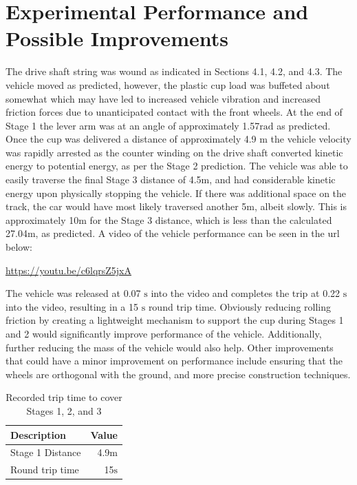 \documentclass[a4paper]{article}
\begin{document}
\section{Experimental Performance and Possible Improvements}
The drive shaft string was wound as indicated in Sections 4.1, 4.2, and 4.3. The vehicle moved as predicted, however, the plastic cup load was buffeted about somewhat which may have led to increased vehicle vibration and increased friction forces due to unanticipated contact with the front wheels. At the end of Stage 1 the lever arm was at an angle of approximately 1.57$\si{\radian}$ as predicted. Once the cup was delivered a distance of approximately 4.9 $\si{\meter}$ the vehicle velocity was rapidly arrested as the counter winding on the drive shaft converted kinetic energy to potential energy, as per the Stage 2 prediction. The vehicle was able to easily traverse the final Stage 3 distance of 4.5$\si{\meter}$, and had considerable kinetic energy upon physically stopping the vehicle. If there was additional space on the track, the car would have most likely traversed another 5$\si{\meter}$, albeit slowly. This is approximately 10$\si{\meter}$ for the Stage 3 distance, which is less than the calculated 27.04$\si{\meter}$, as predicted. A video of the vehicle performance can be seen in the url below:
\begin{center}
	\url{https://youtu.be/c6lqrsZ5jxA}
\end{center}

The vehicle was released at 0.07 $\si{\second}$ into the video and completes the trip at 0.22 $\si{\second}$ into the video, resulting in a 15 $\si{\second}$ round trip time. Obviously reducing rolling friction by creating a lightweight mechanism to support the cup during Stages 1 and 2 would significantly improve performance of the vehicle. Additionally, further reducing the mass of the vehicle would also help. Other improvements that could have a minor improvement on performance include ensuring that the wheels are orthogonal with the ground, and more precise construction techniques.

\begin{table}[h]
	\centering
	\caption{Recorded trip time to cover Stages 1, 2, and 3}
	\begin{tabular}{lr}
		\toprule
		Description & Value \\
		\midrule
		Stage 1 Distance & ~4.9m \\
		Round trip time & 15$\si{\second}$ \\
		\bottomrule
	\end{tabular}
\end{table}
\end{document}
